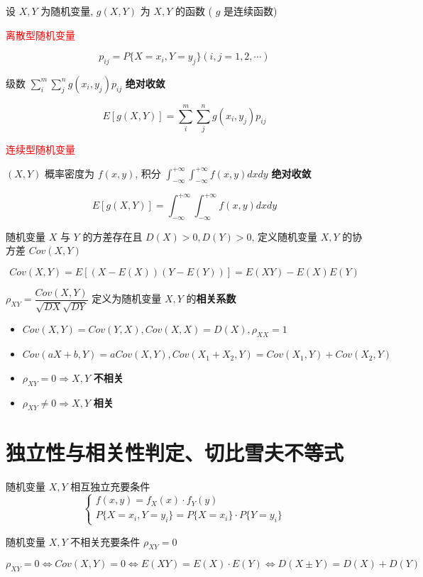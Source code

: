 \begin{definition}[数学期望]
设 $X,Y$ 为随机变量, $g(X,Y)$ 为 $X,Y$ 的函数 ( $g$ 是连续函数)

\textcolor{red}{离散型随机变量}

	$$p_{ij} = P\{X = x_{i},Y = y_{j}\}(i,j = 1,2,\cdots)$$

	级数 $\sum\limits_{i}^{m}\sum\limits_{j}^{n}g(x_{i},y_{j})p_{ij}$ \textbf{绝对收敛} 

	$$E[g(X,Y)] = \sum\limits_{i}^{m}\sum\limits_{j}^{n} g(x_{i},y_{j})p_{ij}$$

\textcolor{red}{连续型随机变量}

	$(X,Y)$ 概率密度为 $f(x,y)$, 积分 $\int_{-\infty}^{+\infty}\int_{-\infty}^{+\infty}f(x,y)dxdy$ \textbf{绝对收敛}

	$$E[g(X,Y)] = \int_{-\infty}^{+\infty}\int_{-\infty}^{+\infty}f(x,y)dxdy$$
\end{definition}


\begin{definition}[协方差与相关系数]
	随机变量 $X$ 与 $Y$ 的方差存在且 $D(X) > 0, D(Y) > 0$, 定义随机变量 $X,Y$ 的协方差 $Cov(X,Y)$ 

	$$Cov(X,Y) = E[(X-E(X))(Y-E(Y))] = E(XY) - E(X)E(Y)$$
	
	$\rho_{XY} = \dfrac{Cov(X,Y)}{\sqrt{DX}\sqrt{DY}}$ 定义为随机变量 $X,Y$ 的\textbf{相关系数}
\end{definition}
\begin{corollary}[协方差和相关系数推论]
	\begin{itemize}
		\item $Cov(X,Y) = Cov(Y,X), Cov(X,X) = D(X), \rho_{XX} = 1$
		\item $Cov(aX + b,Y) = aCov(X,Y), Cov(X_{1} + X_{2},Y) = Cov(X_{1},Y) + Cov(X_{2},Y)$
		\item $\rho_{XY} = 0\Rightarrow X,Y$ \textbf{不相关}
		\item $\rho_{XY}\neq 0\Rightarrow X,Y$ \textbf{相关}
	\end{itemize}
\end{corollary}

\section{独立性与相关性判定、切比雪夫不等式}
\begin{corollary}[独立性与相关性判定]
	随机变量 $X,Y$ 相互独立充要条件
	$$\begin{cases}
		f(x,y) = f_{X}(x)\cdot f_{Y}(y)\\
		P\{X = x_{i},Y = y_{i}\} = P\{X = x_{i}\}\cdot P\{Y = y_{i}\}
	\end{cases}$$

	随机变量 $X,Y$ 不相关充要条件 $\rho_{XY} = 0$

	$$\rho_{XY} = 0\Leftrightarrow Cov(X,Y) = 0\Leftrightarrow E(XY) = E(X)\cdot E(Y)\Leftrightarrow D(X \pm Y) = D(X) + D(Y)$$
\end{corollary}


